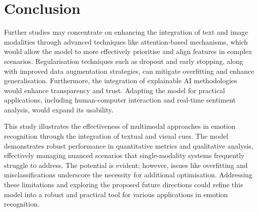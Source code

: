\documentclass{article}
\theoremstyle{plain}
\theoremstyle{definition}
\theoremstyle{remark}
\begin{document}
\section{Conclusion}
Further studies may concentrate on enhancing the integration of text and image modalities through advanced techniques like attention-based mechanisms, which would allow the model to more effectively prioritise and align features in complex scenarios. Regularisation techniques such as dropout and early stopping, along with improved data augmentation strategies, can mitigate overfitting and enhance generalisation. Furthermore, the integration of explainable AI methodologies would enhance transparency and trust. Adapting the model for practical applications, including human-computer interaction and real-time sentiment analysis, would expand its usability.

This study illustrates the effectiveness of multimodal approaches in emotion recognition through the integration of textual and visual cues. The model demonstrates robust performance in quantitative metrics and qualitative analysis, effectively managing nuanced scenarios that single-modality systems frequently struggle to address. The potential is evident; however, issues like overfitting and misclassifications underscore the necessity for additional optimisation. Addressing these limitations and exploring the proposed future directions could refine this model into a robust and practical tool for various applications in emotion recognition.

\clearpage
\end{document}
